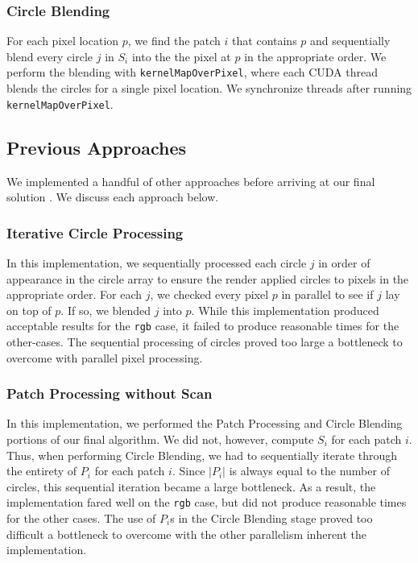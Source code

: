 \documentclass{article}
\begin{document}
\subsubsection{Circle Blending}
For each pixel location $p$, we find the patch $i$ that contains $p$ and sequentially blend every circle $j$ in $S_i$ into the the pixel at $p$ in the appropriate order. We perform the blending with \verb+kernelMapOverPixel+, where each CUDA thread blends the circles for a single pixel location. We synchronize threads after running \verb+kernelMapOverPixel+. 

\subsection{Previous Approaches}
\label{sec:previous}
We implemented a handful of other approaches before arriving at our final solution . We discuss each approach below.

\subsubsection{Iterative Circle Processing}
In this implementation, we sequentially processed each circle $j$ in order of appearance in the circle array to ensure the render applied circles to pixels in the appropriate order. For each $j$, we checked every pixel $p$ in parallel to see if $j$ lay on top of $p$. If so, we blended $j$ into $p$. While this implementation produced acceptable results for the \verb+rgb+ case, it failed to produce reasonable times for the other-cases. The sequential processing of circles proved too large a bottleneck to overcome with parallel pixel processing.

\subsubsection{Patch Processing without Scan}
In this implementation, we performed the Patch Processing and Circle Blending portions of our final algorithm. We did not, however, compute $S_i$ for each patch $i$. Thus, when performing Circle Blending, we had to sequentially iterate through the entirety of $P_i$ for each patch $i$. Since $|P_i|$ is always equal to the number of circles, this sequential iteration became a large bottleneck. As a result, the implementation fared well on the \verb+rgb+ case, but did not produce reasonable times for the other cases. The use of $P_i$s in the Circle Blending stage proved too difficult a bottleneck to overcome with the other parallelism inherent the implementation. 
\end{document}
